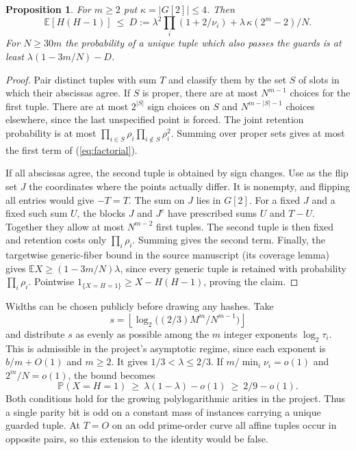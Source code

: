 \documentclass[11pt]{article}
\newtheorem{proposition}{Proposition}
\newcommand{\E}{\mathbb E}
\newcommand{\Prb}{\mathbb P}
\begin{document}
\begin{proposition}
For $m\ge2$ put $\kappa=|G[2]|\le4$. Then
\begin{equation}
 \E[H(H-1)]\ \le\ D :=
 \lambda^2\prod_i(1+2/\nu_i)
 +\lambda\,\kappa(2^m-2)/N . \label{eq:factorial}
\end{equation}
For $N\ge30m$ the probability of a unique tuple which also passes
the guards is at least $\lambda(1-3m/N)-D$.
\end{proposition}
\begin{proof}
Pair distinct tuples with sum $T$ and classify them by the set $S$
of slots in which their abscissas agree. If $S$ is proper, there are
at most $N^{m-1}$ choices for the first tuple. There are at most
$2^{|S|}$ sign choices on $S$ and $N^{m-|S|-1}$ choices elsewhere,
since the last unspecified point is forced. The joint retention
probability is at most $\prod_{i\in S}\rho_i\prod_{i\notin S}\rho_i^2$.
Summing over proper sets gives at most the first term of
(\ref{eq:factorial}).

If all abscissas agree, the second tuple is obtained by sign changes.
Use as the flip set $J$ the coordinates where the points actually
differ. It is nonempty, and flipping all entries would give $-T=T$.
The sum on $J$ lies in $G[2]$. For a fixed $J$ and a fixed such sum
$U$, the blocks $J$ and $J^c$ have prescribed sums $U$ and $T-U$.
Together they allow at most $N^{m-2}$ first tuples. The second tuple
is then fixed and retention costs only $\prod_i\rho_i$. Summing gives
the second term. Finally, the targetwise generic-fiber bound in the
source manuscript (its coverage lemma) gives
$\E X\ge(1-3m/N)\lambda$, since every generic tuple is retained with
probability $\prod_i\rho_i$. Pointwise
$1_{\{X=H=1\}}\ge X-H(H-1)$, proving the claim.
\end{proof}

Widths can be chosen publicly before drawing any hashes. Take
\[
 s=\left\lfloor\log_2\big((2/3)M^m/N^{m-1}\big)\right\rfloor
\]
and distribute $s$ as evenly as possible among the $m$ integer
exponents $\log_2\tau_i$. This is admissible in the project's
asymptotic regime, since each exponent is $b/m+O(1)$ and $m\ge2$.
It gives $1/3<\lambda\le2/3$. If $m/\min_i\nu_i=o(1)$ and
$2^m/N=o(1)$, the bound becomes
\[
     \Prb(X=H=1)\ \ge\ \lambda(1-\lambda)-o(1)
                       \ \ge\ 2/9-o(1).
\]
Both conditions hold for the growing polylogarithmic arities in the
project. Thus a single parity bit is odd on a constant mass of
instances carrying a unique guarded tuple. At $T=O$ on an odd
prime-order curve all affine tuples occur in opposite pairs, so this
extension to the identity would be false.
\end{document}
